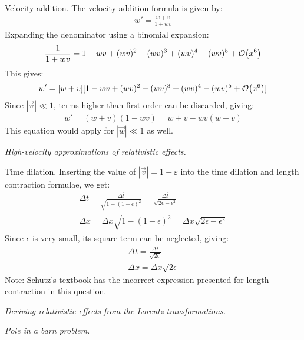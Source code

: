 \documentclass{report}
\begin{document}
\begin{subquests}
\begin{subquests}
		\item Velocity addition.
		The velocity addition formula is given by:
		\begin{gather*}
			w' = \frac{w+v}{1+wv}
		\end{gather*}
		Expanding the denominator using a binomial expansion:
		\begin{gather*}
			\frac{1}{1+wv} = 1-wv+(wv)^2-(wv)^3+(wv)^4-(wv)^5+\order{x^6}
		\end{gather*}
		This gives:
		\begin{gather*}
			w' = [w+v][1-wv+(wv)^2-(wv)^3+(wv)^4-(wv)^5+\order{x^6}]
		\end{gather*}
		Since $|{\vec v}| \ll 1$, terms higher than first-order can be discarded, giving:
		\begin{gather*}
			w' = (w+v)(1-wv) = w + v - wv(w + v)
		\end{gather*}
		This equation would apply for $|{\vec w}| \ll 1$ as well.
	\end{subquests}

	\item \emph{High-velocity approximations of relativistic effects.}
	\begin{subquests}
		\item Time dilation.
		Inserting the value of $|{\vec v}| = 1-\varepsilon$ into the time dilation and length contraction formulae, we get:
		\begin{gather*}
			\Delta{t} = \frac{\Delta{\bar{t}}}{\sqrt{1-(1-\epsilon)^2}}=\frac{\Delta{\bar{t}}}{\sqrt{2\epsilon-\epsilon^2}} \\
			\Delta{x} = \Delta{\bar{x}}{\sqrt{1-(1-\epsilon)^2}}=\Delta{\bar{x}}{\sqrt{2\epsilon-\epsilon^2}}
		\end{gather*}
		Since $\epsilon$ is very small, its square term can be neglected, giving:
		\begin{gather*}
			\Delta{t} = \frac{\Delta{\bar{t}}}{\sqrt{2\epsilon}} \\
			\Delta{x} = \Delta{\bar{x}}\sqrt{2\epsilon}
		\end{gather*}	
		Note: Schutz's textbook has the incorrect expression presented for length contraction in this question.
	\end{subquests}

	\item \emph{Deriving relativistic effects from the Lorentz transformations.}

	\item \emph{Pole in a barn problem.}
	\begin{subquests}
		\item


\end{subquests}
\end{subquests}
\end{document}
